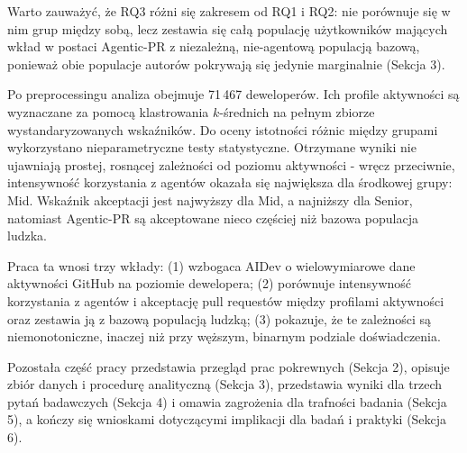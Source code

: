 Warto zauważyć, że RQ3 różni się zakresem od RQ1 i RQ2: nie porównuje się w nim grup między sobą, lecz zestawia się całą populację użytkowników mających wkład w postaci Agentic-PR z niezależną, nie-agentową populacją bazową, ponieważ obie populacje autorów pokrywają się jedynie marginalnie (Sekcja 3).

Po preprocessingu analiza obejmuje 71\,467 deweloperów. Ich profile aktywności są wyznaczane za pomocą klastrowania $k$-średnich na pełnym zbiorze wystandaryzowanych wskaźników. Do oceny istotności różnic między grupami wykorzystano nieparametryczne testy statystyczne. Otrzymane wyniki nie ujawniają prostej, rosnącej zależności od poziomu aktywności - wręcz przeciwnie, intensywność korzystania z agentów okazała się największa dla środkowej grupy: Mid. Wskaźnik akceptacji jest najwyższy dla Mid, a najniższy dla Senior, natomiast Agentic-PR są akceptowane nieco częściej niż bazowa populacja ludzka.

Praca ta wnosi trzy wkłady: (1) wzbogaca AIDev o wielowymiarowe dane aktywności GitHub na poziomie dewelopera; (2) porównuje intensywność korzystania z agentów i akceptację pull requestów między profilami aktywności oraz zestawia ją z bazową populacją ludzką; (3) pokazuje, że te zależności są niemonotoniczne, inaczej niż przy węższym, binarnym podziale doświadczenia.

Pozostała część pracy przedstawia przegląd prac pokrewnych (Sekcja 2), opisuje zbiór danych i procedurę analityczną (Sekcja 3), przedstawia wyniki dla trzech pytań badawczych (Sekcja 4) i omawia zagrożenia dla trafności badania (Sekcja 5), a kończy się wnioskami dotyczącymi implikacji dla badań i praktyki (Sekcja 6).

